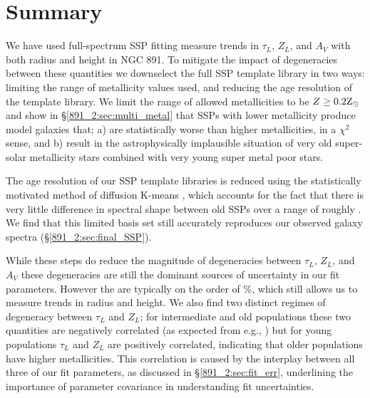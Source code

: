 \section{Summary}
\label{891_2:sec:summary}

We have used full-spectrum SSP fitting measure trends in $\tau_L$,
$Z_L$, and $A_V$ with both radius and height in NGC 891. To mitigate
the impact of degeneracies between these quantities we downselect the
full  SSP template library in two ways: limiting
the range of metallicity values used, and reducing the age resolution
of the template library. We limit the range of allowed metallicities
to be $Z \geq 0.2\mathrm{Z}_{\odot}$ and show in \S\ref{891_2:sec:multi_metal} that SSPs
with lower metallicity produce model galaxies that; a) are
statistically worse than higher metallicities, in a $\chi^2$ sense, and
b) result in the astrophysically implausible situation of very old
super-solar metallicity stars combined with very young super metal
poor stars.

The age resolution of our SSP template libraries is reduced using the
statistically motivated method of diffusion K-means
, which accounts for the fact that there is very
little difference in spectral shape between old SSPs over a range of
roughly . We find that this limited basis set still
accurately reproduces our observed galaxy spectra
(\S\ref{891_2:sec:final_SSP}).

While these steps do reduce the magnitude of degeneracies between
$\tau_L$, $Z_L$, and $A_V$ these degeneracies are still the dominant
sources of uncertainty in our fit parameters. However the are
typically on the order of \%, which still allows us to measure
trends in radius and height. We also find two distinct regimes of
degeneracy between $\tau_L$ and $Z_L$; for intermediate and old
populations these two quantities are negatively correlated (as
expected from e.g., \citet{Oconnel76,Aaronson78,Worthey94,dePaz02})
but for young populations $\tau_L$ and $Z_L$ are positively
correlated, indicating that older populations have higher
metallicities. This correlation is caused by the interplay between all
three of our fit parameters, as discussed in \S\ref{891_2:sec:fit_err},
underlining the importance of parameter covariance in understanding
fit uncertainties.


